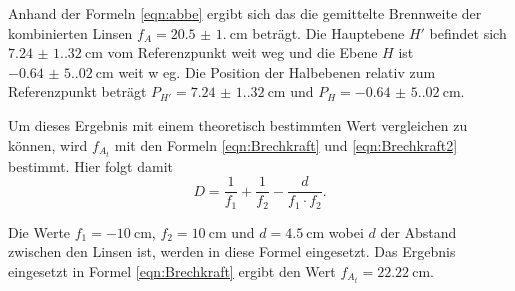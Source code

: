 Anhand der Formeln \ref{eqn:abbe} ergibt sich das die gemittelte Brennweite der kombinierten Linsen $f_A=\qty{20.5(1.0)}{\centi\meter}$ beträgt. 
Die Hauptebene $H'$ befindet sich $\qty{7.24(1.32)}{\centi\meter}$ vom Referenzpunkt
weit weg und die Ebene $H$ ist $\qty{-0.64(5.02)}{\centi\meter}$ weit w eg.
Die Position der Halbebenen relativ zum Referenzpunkt beträgt $P_{H'}=\qty{7.24(1.32)}{\centi\meter}$  und $P_H=\qty{-0.64(5.02)}{\centi\meter}$.

\noindent Um dieses Ergebnis mit einem theoretisch bestimmten Wert vergleichen zu können, wird $f_{A_t}$ mit den Formeln \ref{eqn:Brechkraft} und \ref{eqn:Brechkraft2} bestimmt.
Hier folgt damit
\begin{equation*}
  D=\frac{1}{f_1}+\frac{1}{f_2}-\frac{d}{f_1 \cdot f_2} \text{.}
\end{equation*} 

\noindent Die Werte $f_1=\qty{-10}{\centi\meter}$, $f_2=\qty{10}{\centi\meter}$ und $d=\qty{4.5}{\centi\meter}$ wobei $d$ der Abstand zwischen den Linsen ist, werden in diese Formel eingesetzt.
Das Ergebnis eingesetzt in Formel \ref{eqn:Brechkraft} ergibt den Wert $f_{A_t}=\qty{22.22}{\centi\meter}$.

